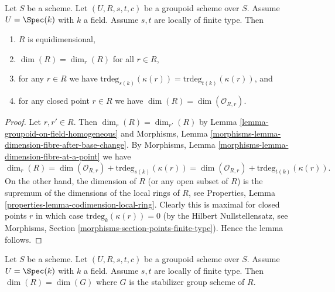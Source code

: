 \begin{lemma}
\label{lemma-groupoid-on-field-locally-finite-type-dimension}
Let $S$ be a scheme. Let $(U, R, s, t, c)$ be a groupoid scheme
over $S$. Assume $U = \Spec(k)$ with $k$ a field.
Assume $s, t$ are locally of finite type.
Then
\begin{enumerate}
\item $R$ is equidimensional,
\item $\dim(R) = \dim_r(R)$ for all $r \in R$,
\item for any $r \in R$ we have
$\text{trdeg}_{s(k)}(\kappa(r)) = \text{trdeg}_{t(k)}(\kappa(r))$, and
\item for any closed point $r \in R$ we have
$\dim(R) = \dim(\mathcal{O}_{R, r})$.
\end{enumerate}
\end{lemma}

\begin{proof}
Let $r, r' \in R$.
Then $\dim_r(R) = \dim_{r'}(R)$ by
Lemma \ref{lemma-groupoid-on-field-homogeneous}
and
Morphisms, Lemma \ref{morphisms-lemma-dimension-fibre-after-base-change}.
By
Morphisms, Lemma \ref{morphisms-lemma-dimension-fibre-at-a-point}
we have
$$
\dim_r(R) =
\dim(\mathcal{O}_{R, r}) + \text{trdeg}_{s(k)}(\kappa(r)) =
\dim(\mathcal{O}_{R, r}) + \text{trdeg}_{t(k)}(\kappa(r)).
$$
On the other hand, the dimension of $R$ (or any open subset of $R$)
is the supremum of the dimensions of the local rings of $R$, see
Properties, Lemma \ref{properties-lemma-codimension-local-ring}.
Clearly this is maximal for closed points $r$ in which case
$\text{trdeg}_k(\kappa(r)) = 0$ (by the Hilbert Nullstellensatz, see
Morphisms, Section \ref{morphisms-section-points-finite-type}).
Hence the lemma follows.
\end{proof}

\begin{lemma}
\label{lemma-groupoid-on-field-dimension-equal-stabilizer}
Let $S$ be a scheme. Let $(U, R, s, t, c)$ be a groupoid scheme
over $S$. Assume $U = \Spec(k)$ with $k$ a field.
Assume $s, t$ are locally of finite type.
Then $\dim(R) = \dim(G)$ where $G$ is the stabilizer group scheme of $R$.
\end{lemma}

